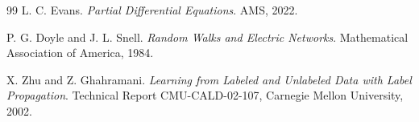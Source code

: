 \begin{notechapter}
\begin{thebibliography}{99}
L. C. Evans.
\textit{Partial Differential Equations}.
AMS, 2022.

P. G. Doyle and J. L. Snell.
\textit{Random Walks and Electric Networks}.
Mathematical Association of America, 1984.

X. Zhu and Z. Ghahramani.
\textit{Learning from Labeled and Unlabeled Data with Label Propagation}.
Technical Report CMU-CALD-02-107, Carnegie Mellon University, 2002.

\end{thebibliography}
\end{notechapter}
